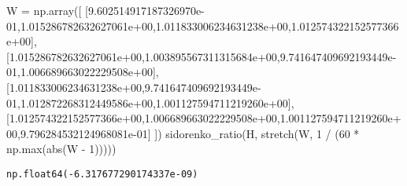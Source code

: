 \documentclass[
  letterpaper,
  DIV=11,
  numbers=noendperiod]{scrartcl}
\newenvironment{Shaded}{\begin{snugshade}}{\end{snugshade}}
\newcommand{\BuiltInTok}[1]{\textcolor[rgb]{0.00,0.23,0.31}{#1}}
\newcommand{\DecValTok}[1]{\textcolor[rgb]{0.68,0.00,0.00}{#1}}
\newcommand{\FloatTok}[1]{\textcolor[rgb]{0.68,0.00,0.00}{#1}}
\newcommand{\NormalTok}[1]{\textcolor[rgb]{0.00,0.23,0.31}{#1}}
\newcommand{\OperatorTok}[1]{\textcolor[rgb]{0.37,0.37,0.37}{#1}}
\begin{document}
\begin{Shaded}
\begin{Highlighting}[]
\NormalTok{W }\OperatorTok{=}\NormalTok{ np.array([}
\NormalTok{ [}\FloatTok{9.602514917187326970e{-}01}\NormalTok{,}\FloatTok{1.015286782632627061e+00}\NormalTok{,}\FloatTok{1.011833006234631238e+00}\NormalTok{,}\FloatTok{1.012574322152577366e+00}\NormalTok{],}
\NormalTok{[}\FloatTok{1.015286782632627061e+00}\NormalTok{,}\FloatTok{1.003895567311315684e+00}\NormalTok{,}\FloatTok{9.741647409692193449e{-}01}\NormalTok{,}\FloatTok{1.006689663022229508e+00}\NormalTok{],}
\NormalTok{[}\FloatTok{1.011833006234631238e+00}\NormalTok{,}\FloatTok{9.741647409692193449e{-}01}\NormalTok{,}\FloatTok{1.012872268312449586e+00}\NormalTok{,}\FloatTok{1.001127594711219260e+00}\NormalTok{],}
\NormalTok{[}\FloatTok{1.012574322152577366e+00}\NormalTok{,}\FloatTok{1.006689663022229508e+00}\NormalTok{,}\FloatTok{1.001127594711219260e+00}\NormalTok{,}\FloatTok{9.796284532124968081e{-}01}\NormalTok{]}
\NormalTok{])}
\NormalTok{sidorenko\_ratio(H, stretch(W, }\DecValTok{1} \OperatorTok{/}\NormalTok{ (}\DecValTok{60} \OperatorTok{*}\NormalTok{ np.}\BuiltInTok{max}\NormalTok{(}\BuiltInTok{abs}\NormalTok{(W }\OperatorTok{{-}} \DecValTok{1}\NormalTok{)))))}
\end{Highlighting}
\end{Shaded}

\begin{verbatim}
np.float64(-6.317677290174337e-09)
\end{verbatim}
\end{document}

